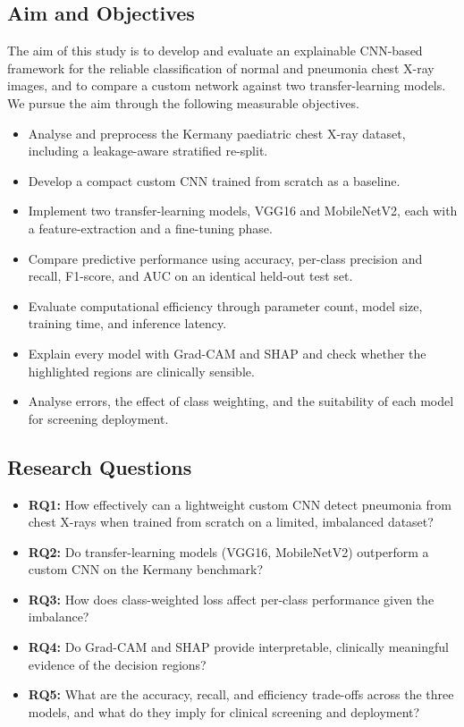 \documentclass[preprint,12pt]{elsarticle}
\begin{document}
\subsection{Aim and Objectives}
The aim of this study is to develop and evaluate an explainable CNN-based framework for the reliable classification of normal and pneumonia chest X-ray images, and to compare a custom network against two transfer-learning models.
We pursue the aim through the following measurable objectives.
\begin{itemize}
    \item Analyse and preprocess the Kermany paediatric chest X-ray dataset, including a leakage-aware stratified re-split.
    \item Develop a compact custom CNN trained from scratch as a baseline.
    \item Implement two transfer-learning models, VGG16 and MobileNetV2, each with a feature-extraction and a fine-tuning phase.
    \item Compare predictive performance using accuracy, per-class precision and recall, F1-score, and AUC on an identical held-out test set.
    \item Evaluate computational efficiency through parameter count, model size, training time, and inference latency.
    \item Explain every model with Grad-CAM and SHAP and check whether the highlighted regions are clinically sensible.
    \item Analyse errors, the effect of class weighting, and the suitability of each model for screening deployment.
\end{itemize}

\subsection{Research Questions}
\begin{itemize}
    \item \textbf{RQ1:} How effectively can a lightweight custom CNN detect pneumonia from chest X-rays when trained from scratch on a limited, imbalanced dataset?
    \item \textbf{RQ2:} Do transfer-learning models (VGG16, MobileNetV2) outperform a custom CNN on the Kermany benchmark?
    \item \textbf{RQ3:} How does class-weighted loss affect per-class performance given the imbalance?
    \item \textbf{RQ4:} Do Grad-CAM and SHAP provide interpretable, clinically meaningful evidence of the decision regions?
    \item \textbf{RQ5:} What are the accuracy, recall, and efficiency trade-offs across the three models, and what do they imply for clinical screening and deployment?
\end{itemize}
\end{document}
